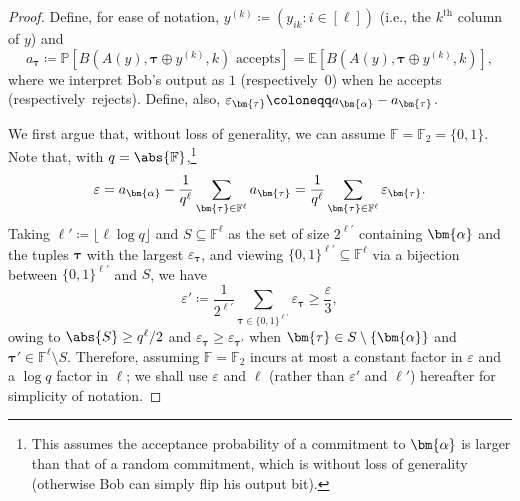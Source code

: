 \documentclass[10pt,a4paper]{article}
\theoremstyle{definition}
\newcommand{\E}{\mathbb E}
\newcommand{\field}{\mathbb{F}}
\renewcommand{\P}{\mathbb P}
\renewcommand{\set}[1]{\left\{#1\right\}}
\newcommand{\eps}{\varepsilon}
\newcommand{\bitset}{\{0,1\}}
\newcommand{\pcommitstring}{y}
\newcommand{\fieldsize}{q}
\def\fe#1{
    \ifnum#1=1
        \alpha
    \else
    \ifnum#1=2
        \beta
    \else
    \ifnum#1=3
        \gamma
    \fi\fi\fi
}
\begin{document}
\begin{proof}
    Define, for ease of notation, $\pcommitstring^{(k)} \coloneqq (\pcommitstring_{ik} : i \in [\ell])$ (i.e., the $k^\text{th}$ column of $\pcommitstring$) and
    \begin{equation*}
        a_{\bm{\tau}} \coloneqq \P\left[B\left(A(\pcommitstring), \bm{\tau} \oplus \pcommitstring^{(k)}, k\right) \text{ accepts}\right] = \E\left[B\left(A(\pcommitstring), \bm{\tau} \oplus \pcommitstring^{(k)}, k\right)\right],
    \end{equation*}
    where we interpret Bob's output as $1$ (respectively\ $0$) when he accepts (respectively\ rejects). Define, also, $\eps_{\bm{\tau}} \coloneqq a_{\bm{\fe1}} - a_{\bm{\tau}}$.
    
    We first argue that, without loss of generality, we can assume $\field = \field_2 = \bitset$. Note that, with $\fieldsize = \abs{\field}$,\footnote{This assumes the acceptance probability of a commitment to $\bm{\fe1}$ is larger than that of a random commitment, which is without loss of generality (otherwise Bob can simply flip his output bit).}
    \begin{equation*}
        \eps = a_{\bm{\fe1}} - \frac1{\fieldsize^\ell} \sum_{\bm{\tau} \in \field^\ell} a_{\bm{\tau}} = \frac1{\fieldsize^\ell} \sum_{\bm{\tau} \in \field^\ell} \eps_{\bm{\tau}}.
    \end{equation*}
    Taking $\ell' \coloneqq \lfloor \ell \log \fieldsize \rfloor$ and $S \subseteq \field^\ell$ as the set of size $2^{\ell'}$ containing $\bm{\fe1}$ and the tuples $\bm{\tau}$ with the largest $\eps_{\bm{\tau}}$, and viewing $\bitset^{\ell'} \subseteq \field^\ell$ via a bijection between $\bitset^{\ell'}$ and $S$, we have 
    \begin{equation*}
        \eps' \coloneqq \frac1{2^{\ell'}} \sum_{\bm{\tau} \in \bitset^{\ell'}} \eps_{\bm{\tau}} \geq \frac{\eps}{3},
    \end{equation*}
    owing to $\abs{S} \geq \fieldsize^\ell/2$ and $\eps_{\bm{\tau}} \geq \eps_{\bm{\tau'}}$ when $\bm{\tau} \in S \setminus \set{\bm{\fe1}}$ and $\bm{\tau'} \in \field^\ell \setminus S$. Therefore, assuming $\field = \field_2$ incurs at most a constant factor in $\eps$ and a $\log \fieldsize$ factor in $\ell$; we shall use $\eps$ and $\ell$ (rather than $\eps'$ and $\ell'$) hereafter for simplicity of notation.
    

\end{proof}
\end{document}
